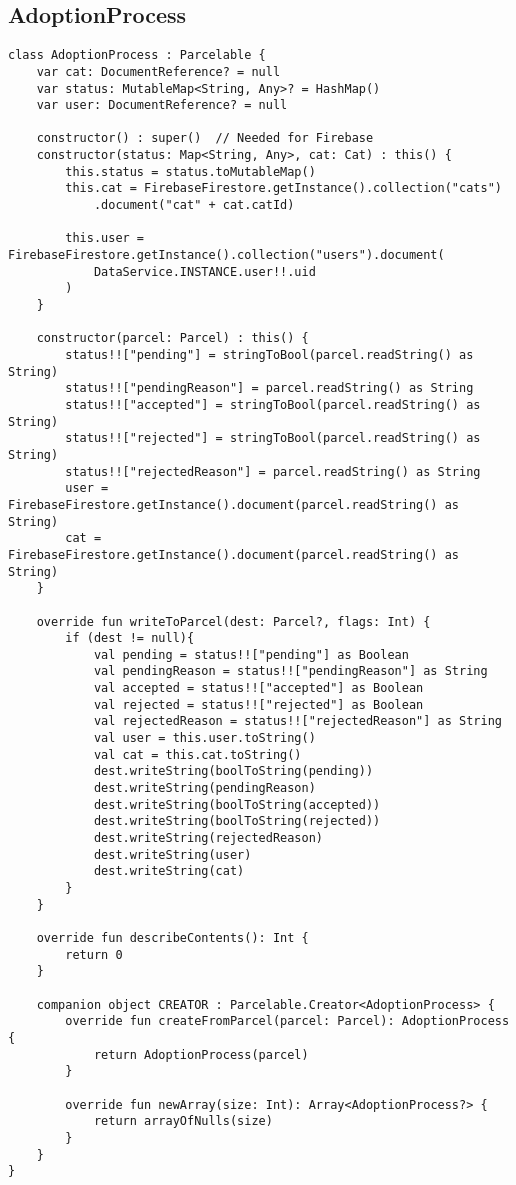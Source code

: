 \subsection{AdoptionProcess}
\begin{verbatim}
class AdoptionProcess : Parcelable {
    var cat: DocumentReference? = null
    var status: MutableMap<String, Any>? = HashMap()
    var user: DocumentReference? = null

    constructor() : super()  // Needed for Firebase
    constructor(status: Map<String, Any>, cat: Cat) : this() {
        this.status = status.toMutableMap()
        this.cat = FirebaseFirestore.getInstance().collection("cats")
            .document("cat" + cat.catId)

        this.user = FirebaseFirestore.getInstance().collection("users").document(
            DataService.INSTANCE.user!!.uid
        )
    }

    constructor(parcel: Parcel) : this() {
        status!!["pending"] = stringToBool(parcel.readString() as String)
        status!!["pendingReason"] = parcel.readString() as String
        status!!["accepted"] = stringToBool(parcel.readString() as String)
        status!!["rejected"] = stringToBool(parcel.readString() as String)
        status!!["rejectedReason"] = parcel.readString() as String
        user = FirebaseFirestore.getInstance().document(parcel.readString() as String)
        cat = FirebaseFirestore.getInstance().document(parcel.readString() as String)
    }

    override fun writeToParcel(dest: Parcel?, flags: Int) {
        if (dest != null){
            val pending = status!!["pending"] as Boolean
            val pendingReason = status!!["pendingReason"] as String
            val accepted = status!!["accepted"] as Boolean
            val rejected = status!!["rejected"] as Boolean
            val rejectedReason = status!!["rejectedReason"] as String
            val user = this.user.toString()
            val cat = this.cat.toString()
            dest.writeString(boolToString(pending))
            dest.writeString(pendingReason)
            dest.writeString(boolToString(accepted))
            dest.writeString(boolToString(rejected))
            dest.writeString(rejectedReason)
            dest.writeString(user)
            dest.writeString(cat)
        }
    }

    override fun describeContents(): Int {
        return 0
    }

    companion object CREATOR : Parcelable.Creator<AdoptionProcess> {
        override fun createFromParcel(parcel: Parcel): AdoptionProcess {
            return AdoptionProcess(parcel)
        }

        override fun newArray(size: Int): Array<AdoptionProcess?> {
            return arrayOfNulls(size)
        }
    }
}
\end{verbatim}

